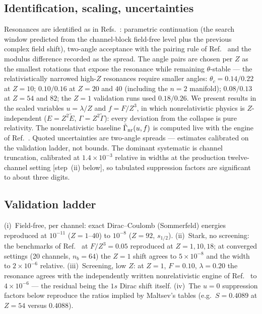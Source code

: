 \documentclass[aps,pra,twocolumn,superscriptaddress,floatfix,longbibliography]{revtex4-2}
\begin{document}
\subsection{Identification, scaling, uncertainties}

Resonances are identified as in
Refs.~\cite{companionD,companionB}: parametric continuation (the
search window predicted from the channel-block field-free level plus
the previous complex field shift), two-angle acceptance with the
pairing rule of Ref.~\cite{companionD} and the modulus difference
recorded as the spread. The angle pairs are chosen per $Z$ as the
smallest rotations that expose the resonance while remaining
$\theta$-stable --- the relativistically narrowed high-$Z$
resonances require smaller angles: $\theta_c=0.14/0.22$ at $Z=10$;
$0.10/0.16$ at $Z=20$ and $40$ (including the $n=2$ manifold);
$0.08/0.13$ at $Z=54$ and $82$; the $Z=1$ validation runs used
$0.18/0.26$. We present results in
the scaled variables $u=\lambda/Z$ and $f=F/Z^{3}$, in which
nonrelativistic physics is $Z$-independent
($E=Z^{2}\tilde E$, $\Gamma=Z^{2}\tilde\Gamma$): every deviation
from the collapse is pure relativity. The nonrelativistic baseline
$\tilde\Gamma_{\rm nr}(u,f)$ is computed live with the engine of
Ref.~\cite{companionD}. Quoted uncertainties are two-angle spreads
--- estimates calibrated on the validation ladder, not bounds. The
dominant systematic is channel truncation, calibrated at
$1.4\times10^{-3}$ relative in widths at the production
twelve-channel setting [step~(ii) below], so tabulated suppression
factors are significant to about three digits.

\subsection{Validation ladder}

(i)~Field-free, per channel: exact Dirac--Coulomb (Sommerfeld)
energies reproduced at $10^{-11}$ ($Z\!=\!1$--$40$) to $10^{-8}$
($Z\!=\!92$, $s_{1/2}$). (ii)~Stark, no screening: the benchmarks
of Ref.~\cite{Maltsev2023} at $F/Z^{3}=0.05$ reproduced at
$Z=1,10,18$; at converged settings (20 channels, $n_b=64$) the
$Z=1$ shift agrees to $5\times10^{-8}$ and the width to
$2\times10^{-6}$ relative. (iii)~Screening, low $Z$: at
$Z=1$, $F=0.10$, $\lambda=0.20$ the resonance agrees with the
independently written nonrelativistic engine of
Ref.~\cite{companionD} to $4\times10^{-6}$ --- the residual being
the $1s$ Dirac shift itself. (iv)~The $u=0$ suppression factors
below reproduce the ratios implied by Maltsev's tables (e.g.\
$S=0.4089$ at $Z=54$ versus $0.4088$).
\end{document}
